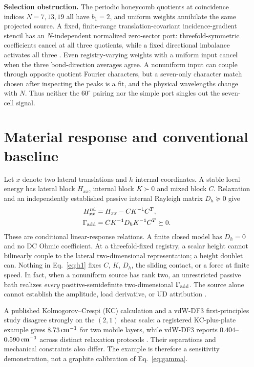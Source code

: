\documentclass[9pt,a4paper,twocolumn]{extarticle}
\begin{document}
\textbf{Selection obstruction.} The periodic honeycomb quotients at coincidence indices $N=7,13,19$ all have $b_1=2$, and uniform weights annihilate the same projected source. A fixed, finite-range translation-covariant incidence-gradient stencil has an $N$-independent normalized zero-sector port: threefold-symmetric coefficients cancel at all three quotients, while a fixed directional imbalance activates all three \cite{udphysics}. Even registry-varying weights with a uniform input cancel when the three bond-direction averages agree. A nonuniform input can couple through opposite quotient Fourier characters, but a seven-only character match chosen after inspecting the peaks is a fit, and the physical wavelengths change with $N$. Thus neither the $60^\circ$ pairing nor the simple port singles out the seven-cell signal.

\section{Material response and conventional baseline}
Let $x$ denote two lateral translations and $h$ internal coordinates. A stable local energy has lateral block $H_{xx}$, internal block $K\succ0$ and mixed block $C$. Relaxation and an independently established passive internal Rayleigh matrix $D_h\succeq0$ give
\begin{align}
 H_{xx}^{\rm rel}&=H_{xx}-CK^{-1}C^T,\label{eq:schur}\\
 \Gamma_{\rm add}&=CK^{-1}D_hK^{-1}C^T\succeq0.\label{eq:gamma}
\end{align}
These are conditional linear-response relations. A finite closed model has $D_h=0$ and no DC Ohmic coefficient. At a threefold-fixed registry, a scalar height cannot bilinearly couple to the lateral two-dimensional representation; a height doublet can. Nothing in Eq.~\eqref{eq:h1} fixes $C$, $K$, $D_h$, the sliding contact, or a force at finite speed. In fact, when a nonuniform source has rank two, an unrestricted passive bath realizes \emph{every} positive-semidefinite two-dimensional $\Gamma_{\rm add}$. The source alone cannot establish the amplitude, load derivative, or UD attribution \cite{udphysics}.

A published Kolmogorov--Crespi (KC) calculation and a vdW-DF3 first-principles study disagree strongly on the $(2,1)$ shear scale: a registered KC-plus-plate example gives $8.73\,{\rm cm}^{-1}$ for two mobile layers, while vdW-DF3 reports $0.404$--$0.590\,{\rm cm}^{-1}$ across distinct relaxation protocols \cite{minkin,lebedeva,udrecord}. Their separations and mechanical constraints also differ. The example is therefore a sensitivity demonstration, not a graphite calibration of Eq.~\eqref{eq:gamma}.
\end{document}
